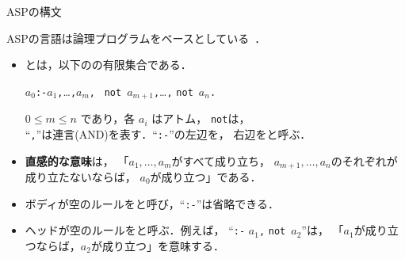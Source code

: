\documentclass[dvipdfmx,11pt]{beamer}
\newcommand{\code}[1]{\lstinline[basicstyle=\ttfamily]{#1}}
\begin{document}
\begin{frame}{ASPの構文}
  \begin{alertblock}{}\centering
    ASPの言語は論理プログラムをベースとしている~\footnotemark．
  \end{alertblock}
  \begin{itemize}
  \item {}とは，以下のの有限集合である．
    \begin{center}
      \begin{minipage}[c]{0.7\textwidth}
        \begin{block}{}\centering
          $a_0$\quad\code{:-}\quad$a_1$\code{,}\ldots\code{,}$a_m$\code{,}
          \ \code{not}~$a_{m+1}$\code{,}\ldots\code{,} \code{not}~$a_n$\code{.}
        \end{block}        
      \end{minipage}
   \end{center}\vfill
    $0 \leq m \leq n$ であり，各 $a_i$ はアトム，
    \code{not}は，\\
    ``\code{,}''は連言(AND)を表す．``\code{:-}''の左辺を，
		右辺をと呼ぶ．
  \item \alert{\bf 直感的な意味}は，
    「$a_1,\ldots,a_m$がすべて成り立ち，
    $a_{m+1},\ldots,a_n$のそれぞれが成り立たないならば，
    $a_0$が成り立つ」である．
  \item ボディが空のルールをと呼び，``\code{:-}''は省略できる．
  \item ヘッドが空のルールをと呼ぶ．例えば，\hspace{-1ex}
    ``\code{:-} $a_1$\code{,} \code{not}~$a_{2}$''は，
    「$a_1$が成り立つならば，$a_2$が成り立つ」を意味する．
  \end{itemize}
\end{frame}
\end{document}
